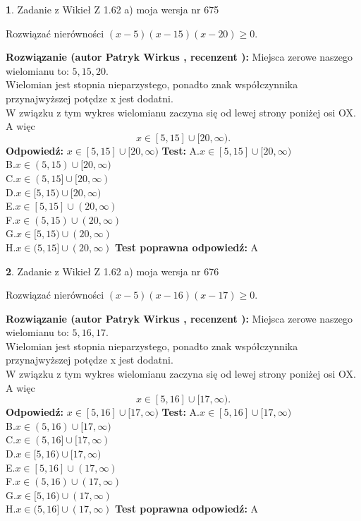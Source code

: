 \documentclass[12pt, a4paper]{article}
\theoremstyle{definition} %
\newtheorem{zad}{}
\newcommand{\zadStart}[1]{\begin{zad}#1\newline}
\newcommand{\zadStop}{\end{zad}}
\newcommand{\rozwStart}[2]{\noindent \textbf{Rozwiązanie (autor #1 , recenzent #2): }\newline}
\newcommand{\rozwStop}{\newline}
\newcommand{\odpStart}{\noindent \textbf{Odpowiedź:}\newline}
\newcommand{\odpStop}{\newline}
\newcommand{\testStart}{\noindent \textbf{Test:}\newline}
\newcommand{\testStop}{\newline}
\newcommand{\kluczStart}{\noindent \textbf{Test poprawna odpowiedź:}\newline}
\newcommand{\kluczStop}{\newline}
\begin{document}
\zadStart{Zadanie z Wikieł Z 1.62 a) moja wersja nr 675}

Rozwiązać nierówności $(x-5)(x-15)(x-20)\ge0$.
\zadStop
\rozwStart{Patryk Wirkus}{}
Miejsca zerowe naszego wielomianu to: $5, 15, 20$.\\
Wielomian jest stopnia nieparzystego, ponadto znak współczynnika przy\linebreak najwyższej potędze x jest dodatni.\\ W związku z tym wykres wielomianu zaczyna się od lewej strony poniżej osi OX. A więc $$x \in [5,15] \cup [20,\infty).$$
\rozwStop
\odpStart
$x \in [5,15] \cup [20,\infty)$
\odpStop
\testStart
A.$x \in [5,15] \cup [20,\infty)$\\
B.$x \in (5,15) \cup [20,\infty)$\\
C.$x \in (5,15] \cup [20,\infty)$\\
D.$x \in [5,15) \cup [20,\infty)$\\
E.$x \in [5,15] \cup (20,\infty)$\\
F.$x \in (5,15) \cup (20,\infty)$\\
G.$x \in [5,15) \cup (20,\infty)$\\
H.$x \in (5,15] \cup (20,\infty)$
\testStop
\kluczStart
A
\kluczStop



\zadStart{Zadanie z Wikieł Z 1.62 a) moja wersja nr 676}

Rozwiązać nierówności $(x-5)(x-16)(x-17)\ge0$.
\zadStop
\rozwStart{Patryk Wirkus}{}
Miejsca zerowe naszego wielomianu to: $5, 16, 17$.\\
Wielomian jest stopnia nieparzystego, ponadto znak współczynnika przy\linebreak najwyższej potędze x jest dodatni.\\ W związku z tym wykres wielomianu zaczyna się od lewej strony poniżej osi OX. A więc $$x \in [5,16] \cup [17,\infty).$$
\rozwStop
\odpStart
$x \in [5,16] \cup [17,\infty)$
\odpStop
\testStart
A.$x \in [5,16] \cup [17,\infty)$\\
B.$x \in (5,16) \cup [17,\infty)$\\
C.$x \in (5,16] \cup [17,\infty)$\\
D.$x \in [5,16) \cup [17,\infty)$\\
E.$x \in [5,16] \cup (17,\infty)$\\
F.$x \in (5,16) \cup (17,\infty)$\\
G.$x \in [5,16) \cup (17,\infty)$\\
H.$x \in (5,16] \cup (17,\infty)$
\testStop
\kluczStart
A
\kluczStop
\end{document}
